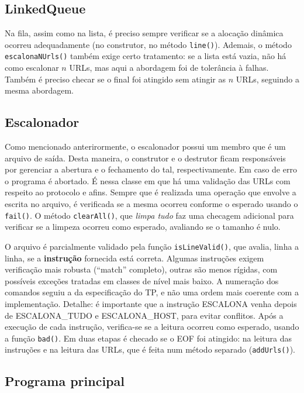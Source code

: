\documentclass{article}
\def\code#1{\texttt{#1}}
\begin{document}
\subsection{LinkedQueue}

Na fila, assim como na lista, é preciso sempre verificar se a alocação dinâmica ocorreu adequadamente (no construtor, no método \code{line()}). Ademais, o método \code{escalonaNUrls()} também exige certo tratamento: se a lista está vazia, não há como escalonar \( n \) URLs, mas aqui a abordagem foi de tolerância à falhas. Também é preciso checar se o final foi atingido sem atingir as \( n \) URLs, seguindo a mesma abordagem. 

\subsection{Escalonador}

Como mencionado anterirormente, o escalonador possui um membro que é um arquivo de saída. Desta maneira, o construtor e o destrutor ficam responsáveis por gerenciar a abertura e o fechamento do tal, respectivamente. Em caso de erro o programa é abortado. É nessa classe em que há uma validação das URLs com respeito ao protocolo e afins. Sempre que é realizada uma operação que envolve a escrita no arquivo, é verificada se a mesma ocorreu conforme o esperado usando o \code{fail()}. O método \code{clearAll()}, que \textit{limpa tudo} faz uma checagem adicional para verificar se a limpeza ocorreu como esperado, avaliando se o tamanho é nulo.

O arquivo é parcialmente validado pela função \code{isLineValid()}, que avalia, linha a linha, se a \textbf{instrução} fornecida está correta. Algumas instruções exigem verificação mais robusta (``match'' completo), outras são menos rígidas, com possíveis exceções tratadas em classes de nível mais baixo. A numeração dos comandos seguiu a da especificação do TP, e não uma ordem mais coerente com a implementação. Detalhe: é importante que a instrução ESCALONA venha depois de ESCALONA\_TUDO e ESCALONA\_HOST, para evitar conflitos. Após a execução de cada instrução, verifica-se se a leitura ocorreu como esperado, usando a função \code{bad()}. Em duas etapas é checado se o EOF foi atingido: na leitura das instruções e na leitura das URLs, que é feita num método separado (\code{addUrls()}).

\subsection{Programa principal}
\end{document}
